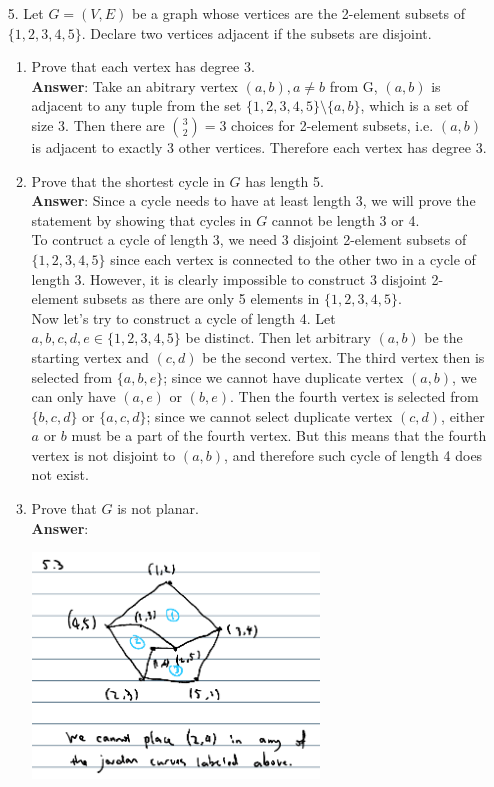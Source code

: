 \documentclass{article}
\begin{document}
\newpage
\begin{itemize}
    \item [5.] Let $G=(V,E)$ be a graph whose vertices are the 2-element subsets of $\{1,2,3,4,5\}$. Declare two vertices adjacent if the subsets are disjoint.
          \begin{enumerate}
              \item Prove that each vertex has degree 3.\\
                    \textbf{Answer}: Take an abitrary vertex $(a,b),a\neq b$ from G, $(a,b)$ is adjacent to any tuple from the set $\{1,2,3,4,5\}\setminus\{a,b\}$, which is a set of size 3. Then there are $\binom{3}{2}=3$ choices for 2-element subsets, i.e. $(a,b)$ is adjacent to exactly 3 other vertices. Therefore each vertex has degree 3.
              \item Prove that the shortest cycle in $G$ has length 5.\\
                    \textbf{Answer}: Since a cycle needs to have at least length 3, we will prove the statement by showing that cycles in $G$ cannot be length 3 or 4.\\
                    To contruct a cycle of length 3, we need 3 disjoint 2-element subsets of $\{1,2,3,4,5\}$ since each vertex is connected to the other two in a cycle of length 3. However, it is clearly impossible to construct 3 disjoint 2-element subsets as there are only 5 elements in $\{1,2,3,4,5\}$.\\
                    Now let's try to construct a cycle of length 4. Let $a,b,c,d,e\in\{1,2,3,4,5\}$ be distinct. Then let arbitrary $(a,b)$ be the starting vertex and $(c,d)$ be the second vertex. The third vertex then is selected from $\{a,b,e\}$; since we cannot have duplicate vertex $(a,b)$, we can only have $(a,e)$ or $(b,e)$. Then the fourth vertex is selected from $\{b,c,d\}$ or $\{a,c,d\}$; since we cannot select duplicate vertex $(c,d)$, either $a$ or $b$ must be a part of the fourth vertex. But this means that the fourth vertex is not disjoint to $(a,b)$, and therefore such cycle of length 4 does not exist.
              \item Prove that $G$ is not planar.\\
                    \textbf{Answer}:
                    \begin{center}
                        \includegraphics[width=3in]{5-3.png}

\end{center}
\end{enumerate}
\end{itemize}
\end{document}
